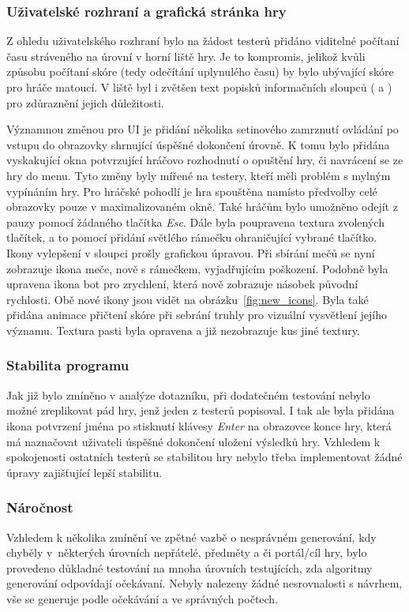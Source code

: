 \subsubsection*{\textbullet Uživatelské rozhraní a grafická stránka hry}
Z ohledu uživatelského rozhraní bylo na žádost testerů přidáno viditelné počítaní času stráveného na úrovní v horní liště hry. Je to kompromis, jelikož kvůli způsobu počítaní skóre (tedy odečítání uplynulého času) by bylo ubývající skóre pro hráče matoucí. V liště byl i zvětšen text popisků informačních sloupců ( a ) pro zdůraznění jejich důležitosti.

Významnou změnou pro UI je přidání několika setinového zamrznutí ovládání po vstupu do obrazovky shrnující úspěšné dokončení úrovně. K tomu bylo přidána vyskakující okna potvrzující hráčovo rozhodnutí o opuštění hry, či navrácení se ze hry do menu. Tyto změny byly mířené na testery, kteří měli problém s mylným vypínáním hry. Pro hráčské pohodlí je hra spouštěna namísto předvolby celé obrazovky pouze v maximalizovaném okně. Také hráčům bylo umožněno odejít z pauzy pomocí žádaného tlačítka \textit{Esc}. Dále byla poupravena textura zvolených tlačítek, a to pomocí přidání světlého rámečku ohraničující vybrané tlačítko.
Ikony vylepšení v sloupci  prošly grafickou úpravou. Při sbírání mečů se nyní zobrazuje ikona meče, nově s rámečkem, vyjadřujícím poškození. Podobně byla upravena ikona bot pro zrychlení, která nově zobrazuje násobek původní rychlosti. Obě nové ikony jsou vidět na obrázku~\ref{fig:new_icons}. Byla také přidána animace přičtení skóre při sebrání truhly pro vizuální vysvětlení jejího významu. Textura pasti byla opravena a již nezobrazuje kus jiné textury.

\subsubsection*{\textbullet Stabilita programu}
Jak již bylo zmíněno v analýze dotazníku, při dodatečném testování nebylo možné zreplikovat pád hry, jenž jeden z testerů popisoval. I tak ale byla přidána ikona potvrzení jména po stisknutí klávesy \textit{Enter} na obrazovce konce hry, která má naznačovat uživateli úspěšné dokončení uložení výsledků hry. Vzhledem k spokojenosti ostatních testerů se stabilitou hry nebylo třeba implementovat žádné úpravy zajišťující lepší stabilitu.

\subsubsection*{\textbullet Náročnost}
Vzhledem k několika zmínění ve zpětné vazbě o nesprávném generování, kdy chyběly v~některých úrovních nepřátelé, předměty a či portál/cíl hry, bylo provedeno důkladné testování na mnoha úrovních testujících, zda algoritmy generování odpovídají očekávaní. Nebyly nalezeny žádné nesrovnalosti s návrhem, vše se generuje podle očekávání a ve správných počtech.


